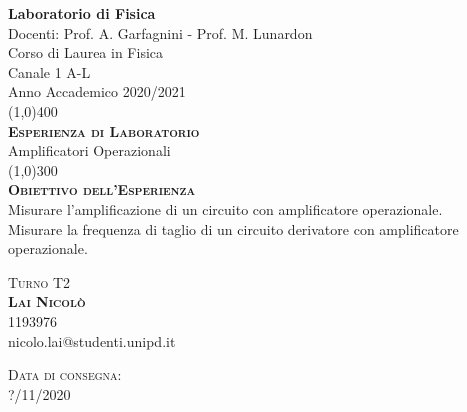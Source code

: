 \documentclass[a4paper,11pt]{article}
\begin{document}
	\def\subsectionautorefname{Sezione} \def\subsubsectionautorefname{Sezione}




	\begin{titlepage}
		\begin{center}
			\Huge{\bfseries Laboratorio di Fisica}\\
				
			\LARGE Docenti: Prof. A. Garfagnini - Prof. M. Lunardon \\
			\Large Corso di Laurea in Fisica\\
			\Large Canale 1 A-L\\
			\Large Anno Accademico 2020/2021\\
			[1cm] \line(1,0){400}\\
			[2cm]
				
			\textsc{\huge{\bfseries  Esperienza di Laboratorio}}\\
			\huge{Amplificatori Operazionali}\\
			[2mm] \line(1,0){300}\\
			[3mm]

			\textsc{\Large{\bfseries  Obiettivo dell'Esperienza}}\\
			\large{Misurare l'amplificazione di un circuito con amplificatore operazionale.\\
			Misurare la frequenza di taglio di un circuito
			derivatore con amplificatore operazionale.}\\
			[8.5cm]
			
			



		\end{center}
				
			\textsc{\Large Turno T2}\\
			[0.5cm] \textsc{\large {\bfseries Lai Nicolò}} \\ 
			\indent\large 1193976 \\ 
			\indent\large nicolo.lai@studenti.unipd.it\\
			
				
				
		\begin{flushright}
				\textsc{\Large Data di consegna:}\\
				\textsc{\large ?/11/2020}					
		\end{flushright}
				
	\end{titlepage}
\cleardoublepage
\end{document}
